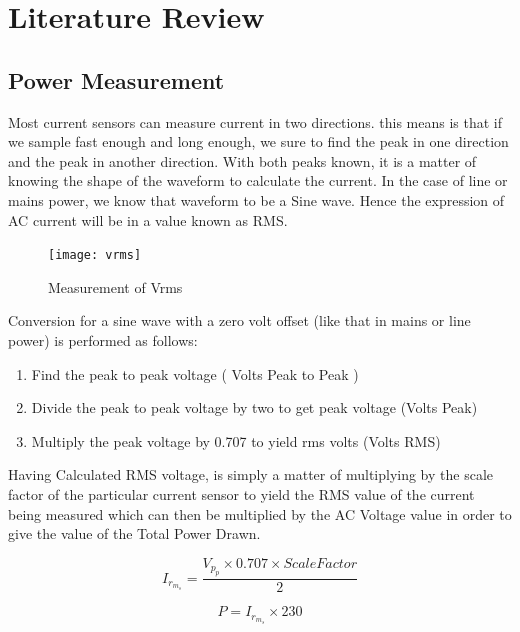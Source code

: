 \newcommand{\tab}{\hspace*{2em}}
\chapter{Literature Review} 

\section{Power Measurement}
{
Most current sensors can measure current in two directions.  this means is that if we sample fast enough and long enough,  we sure to find the peak in one direction and the peak in another direction. With both peaks known, it is a matter of knowing the shape of the waveform to calculate the current. In the case of line or mains power, we know that waveform to be a Sine wave. Hence the expression of AC current  will be in a value known as RMS. 

\begin{figure}[H]
	\texttt{[image: vrms]} %
	\caption{Measurement of Vrms}
	\label{blck}
\end{figure}

Conversion for a sine wave with a zero volt offset (like that in mains or line power) is performed as follows:

\begin{enumerate}
	\item Find the peak to peak voltage  ( Volts Peak to Peak )
	\item Divide the peak to peak voltage by two to get peak voltage (Volts Peak)
	\item Multiply the peak voltage by 0.707 to yield rms volts (Volts RMS)
\end{enumerate}

Having Calculated RMS voltage,  is simply a matter of multiplying by the scale factor of the particular current sensor to yield the RMS value of the current being measured which can then be multiplied by the AC Voltage value in order to give the value of the Total Power Drawn.

\begin{equation}
I_r_m_s = \frac{V_p_p \times 0.707 \times Scale Factor}{2} 
\end{equation}

\begin{equation}
P = I_r_m_s \times 230
\end{equation}

}



